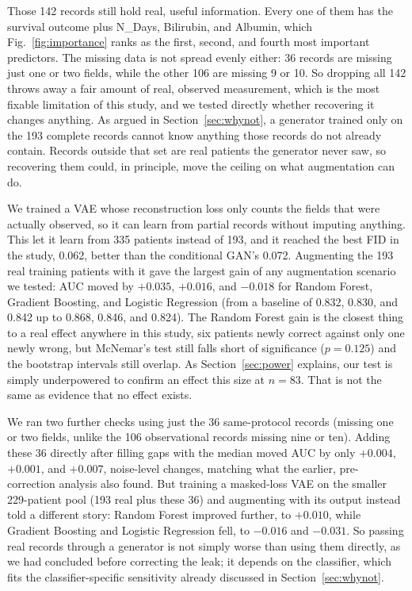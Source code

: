 \documentclass[journal]{IEEEtran}
\begin{document}
Those 142 records still hold real, useful information. Every one of them has the survival outcome plus N\_Days, Bilirubin, and Albumin, which Fig.~\ref{fig:importance} ranks as the first, second, and fourth most important predictors. The missing data is not spread evenly either: 36 records are missing just one or two fields, while the other 106 are missing 9 or 10. So dropping all 142 throws away a fair amount of real, observed measurement, which is the most fixable limitation of this study, and we tested directly whether recovering it changes anything. As argued in Section~\ref{sec:whynot}, a generator trained only on the 193 complete records cannot know anything those records do not already contain. Records outside that set are real patients the generator never saw, so recovering them could, in principle, move the ceiling on what augmentation can do.

We trained a VAE whose reconstruction loss only counts the fields that were actually observed, so it can learn from partial records without imputing anything. This let it learn from 335 patients instead of 193, and it reached the best FID in the study, 0.062, better than the conditional GAN's 0.072. Augmenting the 193 real training patients with it gave the largest gain of any augmentation scenario we tested: AUC moved by $+0.035$, $+0.016$, and $-0.018$ for Random Forest, Gradient Boosting, and Logistic Regression (from a baseline of 0.832, 0.830, and 0.842 up to 0.868, 0.846, and 0.824). The Random Forest gain is the closest thing to a real effect anywhere in this study, six patients newly correct against only one newly wrong, but McNemar's test still falls short of significance ($p = 0.125$) and the bootstrap intervals still overlap. As Section~\ref{sec:power} explains, our test is simply underpowered to confirm an effect this size at $n=83$. That is not the same as evidence that no effect exists.

We ran two further checks using just the 36 same-protocol records (missing one or two fields, unlike the 106 observational records missing nine or ten). Adding these 36 directly after filling gaps with the median moved AUC by only $+0.004$, $+0.001$, and $+0.007$, noise-level changes, matching what the earlier, pre-correction analysis also found. But training a masked-loss VAE on the smaller 229-patient pool (193 real plus these 36) and augmenting with its output instead told a different story: Random Forest improved further, to $+0.010$, while Gradient Boosting and Logistic Regression fell, to $-0.016$ and $-0.031$. So passing real records through a generator is not simply worse than using them directly, as we had concluded before correcting the leak; it depends on the classifier, which fits the classifier-specific sensitivity already discussed in Section~\ref{sec:whynot}.
\end{document}
